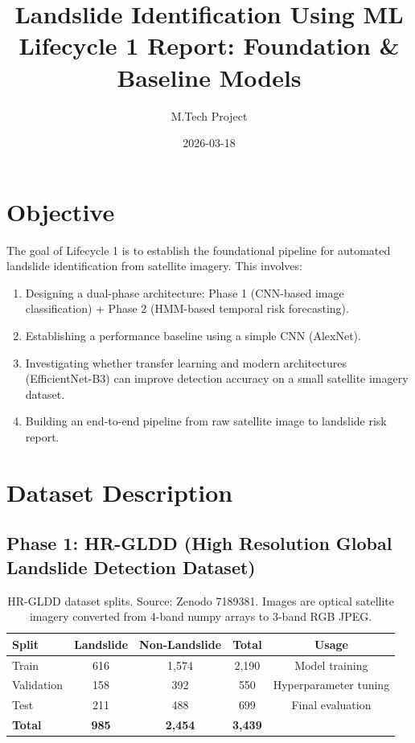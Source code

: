 \documentclass[11pt]{article}
\title{Landslide Identification Using ML \\ \large Lifecycle 1 Report: Foundation \& Baseline Models}
\author{M.Tech Project}
\date{2026-03-18}
\begin{document}
\maketitle

\section{Objective}

The goal of Lifecycle 1 is to establish the foundational pipeline for automated landslide identification from satellite imagery. This involves:

\begin{enumerate}
    \item Designing a dual-phase architecture: Phase 1 (CNN-based image classification) + Phase 2 (HMM-based temporal risk forecasting).
    \item Establishing a performance baseline using a simple CNN (AlexNet).
    \item Investigating whether transfer learning and modern architectures (EfficientNet-B3) can improve detection accuracy on a small satellite imagery dataset.
    \item Building an end-to-end pipeline from raw satellite image to landslide risk report.
\end{enumerate}

\section{Dataset Description}

\subsection{Phase 1: HR-GLDD (High Resolution Global Landslide Detection Dataset)}

\begin{table}[H]
    \centering
    \renewcommand{\arraystretch}{1.2}
    \begin{tabular}{lcccc}
        \toprule
        \textbf{Split} & \textbf{Landslide} & \textbf{Non-Landslide} & \textbf{Total} & \textbf{Usage} \\
        \midrule
        Train      & 616   & 1,574 & 2,190 & Model training \\
        Validation & 158   & 392   & 550   & Hyperparameter tuning \\
        Test       & 211   & 488   & 699   & Final evaluation \\
        \midrule
        \textbf{Total} & \textbf{985} & \textbf{2,454} & \textbf{3,439} & \\
        \bottomrule
    \end{tabular}
    \caption{HR-GLDD dataset splits. Source: Zenodo 7189381. Images are optical satellite imagery converted from 4-band numpy arrays to 3-band RGB JPEG.}
\end{table}
\end{document}
